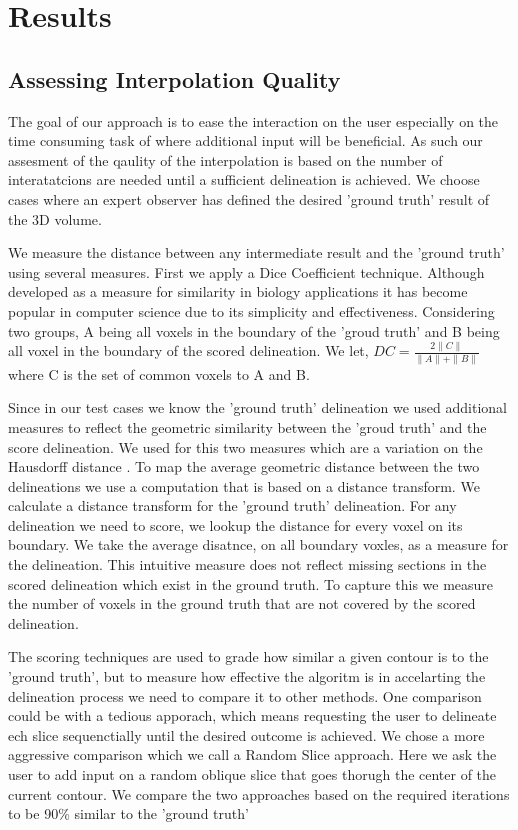 \section{Results}
\label{sec:results}

\subsection{Assessing Interpolation Quality}
The goal of our approach is to ease the interaction on the user especially on the time consuming task of where additional input will be beneficial. As such our assesment of the qaulity of the interpolation is based on the number of interatatcions are needed until a sufficient delineation is achieved. We choose cases where an expert observer has defined the desired 'ground truth' result of the 3D volume. 

We measure the distance between any intermediate result and the 'ground truth' using several measures. First we apply a Dice Coefficient \cite{1945} technique. Although developed as a measure for similarity in biology applications it has become popular in computer science due to its simplicity and effectiveness. Considering two groups, A being all voxels in the boundary of the 'groud truth' and B being all voxel in the boundary of the scored delineation. 
We let, $ DC =\frac{2\|C\|}{\|A\|+\|B\|} $ where C is the set of common voxels to A and B.

Since in our test cases we know the 'ground truth' delineation we used additional measures to reflect the geometric similarity between the 'groud truth' and the score delineation. We used for this two measures which are a variation on the Hausdorff distance \cite{rockafellar2010variational}. To map the average geometric distance between the two delineations we use a computation that is based on a distance transform. We calculate a distance transform for the 'ground truth' delineation. For any delineation we need to score, we lookup the distance for every voxel on its boundary. We take the average disatnce, on all boundary voxles, as a measure for the delineation. This intuitive measure does not reflect missing sections in the scored delineation which exist in the ground truth. To capture this we measure the number of voxels in the ground truth that are not covered by the scored delineation.

The scoring techniques are used to grade how similar a given contour is to the 'ground truth', but to measure how effective the algoritm is in accelarting the delineation process we need to compare it to other methods. One comparison could be with a tedious apporach, which means requesting the user to delineate ech slice sequenctially until the desired outcome is achieved. We chose a more aggressive comparison which we call a Random Slice approach. Here we ask the user to add input on a random oblique slice that goes thorugh the center of the current contour. We compare the two approaches based on the required iterations to be 90\% similar to the 'ground truth'

